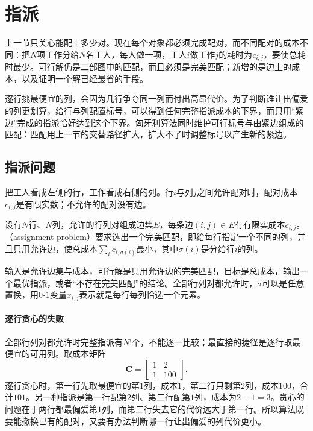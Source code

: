 
\section{指派}
\label{sec:graph-assignment}

上一节只关心能配上多少对。现在每个对象都必须完成配对，而不同配对的成本不同：把$N$项工作分给$N$名工人，每人做一项，工人$i$做工作$j$的耗时为$c_{i,j}$，要使总耗时最少。可行解仍是二部图中的匹配，而且必须是完美匹配；新增的是边上的成本，以及证明一个解已经最省的手段。

逐行挑最便宜的列，会因为几行争夺同一列而付出高昂代价。为了判断谁让出偏爱的列更划算，给行与列配置标号，可以得到任何完整指派成本的下界，而只用“紧边”完成的指派恰好达到这个下界。匈牙利算法同时维护可行标号与由紧边组成的匹配：匹配用上一节的交替路径扩大，扩大不了时调整标号以产生新的紧边。

\subsection{指派问题}
\label{sec:graph-opt-assign-problem}

把工人看成左侧的行，工作看成右侧的列。行$i$与列$j$之间允许配对时，配对成本$c_{i,j}$是有限实数；不允许的配对没有边。

\begin{definition}[指派问题]
\label{def:graph-opt-assignment}
设有$N$行、$N$列，允许的行列对组成边集$E$，每条边$(i,j)\in E$有有限实成本$c_{i,j}$。（assignment problem）要求选出一个完美匹配，即给每行指定一个不同的列，并且只用允许边，使总成本$\sum_i c_{i,\sigma(i)}$最小，其中$\sigma(i)$是分给行$i$的列。
\end{definition}

输入是允许边集与成本，可行解是只用允许边的完美匹配，目标是总成本，输出一个最优指派，或者“不存在完美匹配”的结论。全部行列对都允许时，$\sigma$可以是任意置换，用$0$-$1$变量$x_{i,j}$表示就是每行每列恰选一个元素。

\paragraph{逐行贪心的失败}
全部行列对都允许时完整指派有$N!$个，不能逐一比较；最直接的捷径是逐行取最便宜的可用列。取成本矩阵
\[
  \bm C=\begin{bmatrix}1&2\\1&100\end{bmatrix}.
\]
逐行贪心时，第一行先取最便宜的第$1$列，成本$1$，第二行只剩第$2$列，成本$100$，合计$101$。另一种指派是第一行配第$2$列、第二行配第$1$列，成本为$2+1=3$。贪心的问题在于两行都最偏爱第$1$列，而第二行失去它的代价远大于第一行。所以算法既要能撤换已有的配对，又要有办法判断哪一行让出偏爱的列代价更小。

